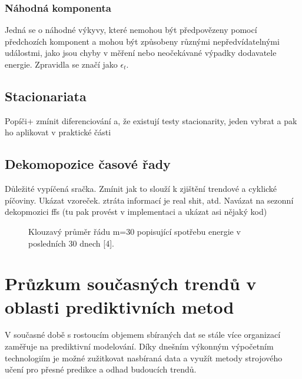 \documentclass[FM,BP,fonts]{tulthesis}
\begin{document}
\subsection{Náhodná komponenta}
 Jedná se o náhodné výkyvy, které nemohou být předpovězeny pomocí předchozích komponent a mohou být způsobeny různými nepředvídatelnými událostmi, jako jsou chyby v měření nebo neočekávané výpadky dodavatele energie. Zpravidla se značí jako  $\epsilon_t$.
 

\section {Stacionariata}
Popíči+ zmínit diferenciování a, že existují testy stacionarity, jeden vybrat a pak ho aplikovat v praktické části

\section{Dekomopozice časové řady}
Důležité vypíčená sračka. Zmínit jak to slouží k zjištění trendové a cyklické píčoviny. Ukázat vzoreček. ztráta informací je real shit, atd.
Navázat na sezonní dekopmozici ffs (tu pak provést v implementaci a ukázat asi nějaký kod)
 
\begin{figure}[htbp]
	\centering
	\caption{Klouzavý průměr řádu m=30 popisující spotřebu energie v posledních 30 dnech [4]. }
	\label{fig:my_graph}
\end{figure}
% 


\chapter{Průzkum současných trendů v oblasti prediktivních metod}
V současné době s rostoucím objemem sbíraných dat se stále více organizací zaměřuje na prediktivní modelování. Díky dnešním výkonným výpočetním technologiím je možné zužitkovat nasbíraná data a využít metody strojového učení pro přesné predikce a odhad budoucích trendů.
\end{document}
